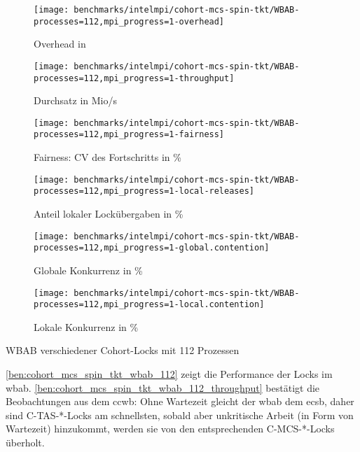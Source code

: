\clearpage

\begin{benchmark}[!h]
    \begin{subfigure}{.5\textwidth}
        \texttt{[image: benchmarks/intelmpi/cohort-mcs-spin-tkt/WBAB-processes=112,mpi\_progress=1-overhead]}
        \caption{Overhead in }
        \label{ben:cohort_mcs_spin_tkt_wbab_112_overhead}
    \end{subfigure}
    \begin{subfigure}{.5\textwidth}
        \texttt{[image: benchmarks/intelmpi/cohort-mcs-spin-tkt/WBAB-processes=112,mpi\_progress=1-throughput]}
        \caption{Durchsatz in Mio/s}
        \label{ben:cohort_mcs_spin_tkt_wbab_112_throughput}
    \end{subfigure}
    \begin{subfigure}{.5\textwidth}
        \texttt{[image: benchmarks/intelmpi/cohort-mcs-spin-tkt/WBAB-processes=112,mpi\_progress=1-fairness]}
        \caption{Fairness: CV des Fortschritts in \%}
        \label{ben:cohort_mcs_spin_tkt_wbab_112_fairness}
    \end{subfigure}
    \begin{subfigure}{.5\textwidth}
        \texttt{[image: benchmarks/intelmpi/cohort-mcs-spin-tkt/WBAB-processes=112,mpi\_progress=1-local-releases]}
        \caption{Anteil lokaler Lockübergaben in \%}
        \label{ben:cohort_mcs_spin_tkt_wbab_112_local_releases}
    \end{subfigure}
    \begin{subfigure}{.5\textwidth}
        \texttt{[image: benchmarks/intelmpi/cohort-mcs-spin-tkt/WBAB-processes=112,mpi\_progress=1-global.contention]}
        \caption{Globale Konkurrenz in \%}
        \label{ben:cohort_mcs_spin_tkt_wbab_112_global_contention}
    \end{subfigure}
    \begin{subfigure}{.5\textwidth}
        \texttt{[image: benchmarks/intelmpi/cohort-mcs-spin-tkt/WBAB-processes=112,mpi\_progress=1-local.contention]}
        \caption{Lokale Konkurrenz in \%}
        \label{ben:cohort_mcs_spin_tkt_wbab_112_local_contention}
    \end{subfigure}
    \caption{WBAB verschiedener Cohort-Locks mit 112 Prozessen}
    \label{ben:cohort_mcs_spin_tkt_wbab_112}
\end{benchmark}

\autoref{ben:cohort_mcs_spin_tkt_wbab_112} zeigt die Performance der Locks im \gls{wbab}.
\autoref{ben:cohort_mcs_spin_tkt_wbab_112_throughput}
bestätigt die Beobachtungen aus dem \gls{ccwb}:
Ohne Wartezeit gleicht der \gls{wbab} dem \gls{ecsb},
daher sind C-TAS-*-Locks am schnellsten,
sobald aber unkritische Arbeit (in Form von Wartezeit) hinzukommt,
werden sie von den entsprechenden C-MCS-*-Locks überholt.

